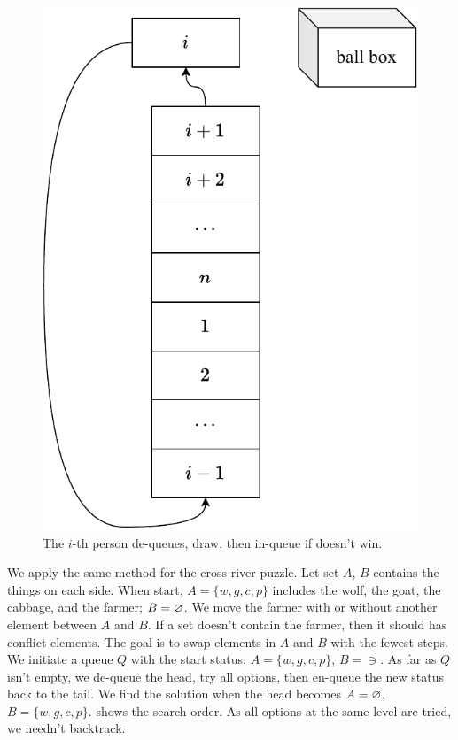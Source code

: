 \documentclass[b5paper]{article}
\begin{document}
\begin{figure}[htbp]
 \centering
 \includegraphics[scale=0.5]{img/luckydraw-queue}
 \caption{The $i$-th person de-queues, draw, then in-queue if doesn't win.}
 \label{fig:luck-draw}
\end{figure}

We apply the same method for the cross river puzzle. Let set $A$, $B$ contains the things on each side. When start, $A = \{w, g, c, p\}$ includes the wolf, the goat, the cabbage, and the farmer; $B=\varnothing$. We move the farmer with or without another element between $A$ and $B$. If a set doesn't contain the farmer, then it should has conflict elements. The goal is to swap elements in $A$ and $B$ with the fewest steps. We initiate a queue $Q$ with the start status: $A = \{w, g, c, p\}$, $B=\ni$. As far as $Q$ isn't empty, we de-queue the head, try all options, then en-queue the new status back to the tail. We find the solution when the head becomes $A=\varnothing$, $B=\{w, g, c, p\}$.  shows the search order. As all options at the same level are tried, we needn't backtrack.
\end{document}

